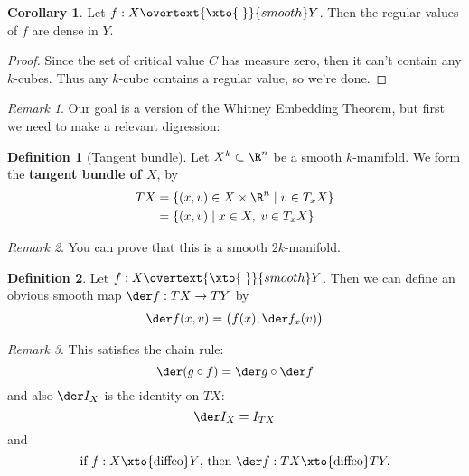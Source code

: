\documentclass[a5paper]{article}
\theoremstyle{definition}%
\newtheorem*{corollary*}{Corollary}
\newtheorem*{definition*}{Definition}
\numberwithin{exercise}{section}
\theoremstyle{remark}%
\newtheorem*{remark*}{Remark}
\renewcommand{\emph}{\textbf}
\begin{document}
\begin{highlight}
\begin{corollary*}
\vspace*{-12pt} Let $f:X\overtext{\xto{\;}}{smooth} Y$. Then the regular values of $f$ are dense in $Y$. 
\end{corollary*}
\end{highlight}

\begin{proof}
Since the set of critical value $C$ has measure zero, then it can't contain any $k$-cubes. Thus any $k$-cube contains a regular value, so we're done. 
\end{proof}

\begin{remark*}
Our goal is a version of the Whitney Embedding Theorem, but first we need to make a relevant digression:
\end{remark*}

\begin{highlight}
\begin{definition*}[Tangent bundle]
Let $X^k\subset \R^n$ be a smooth $k$-manifold. We form the \emph{tangent bundle of $X$}, by 
\begin{align*}
TX&=\{(x,v)\in X\times\R^n \mid v\in T_x X \} \\
&=\{(x,v) \mid x\in X, \; v\in T_x X \} 
\end{align*}
\end{definition*}
\end{highlight}

\begin{remark*}
You can prove that this is a smooth $2k$-manifold. 
\end{remark*}

\begin{highlight}
\begin{definition*}
\vspace*{-12pt} Let $f:X\overtext{\xto{\;}}{smooth} Y$. Then we can define an obvious smooth map $\der f:TX\to TY$ by 
$$\der f(x,v) = \big(f(x), \der f_x (v)\big)$$
\end{definition*}
\end{highlight}

\begin{remark*}
This satisfies the chain rule:
$$\der(g\circ f)=\der g \circ \der f$$
and also $\der I_X$ is the identity on $TX$:
$$\der I_X = I_{TX}$$
and 
$$\text{if }f:X\xto{\text{diffeo}} Y\text{, then }\der f:TX\xto{\text{diffeo}} TY.$$
\end{remark*} 
\end{document}
